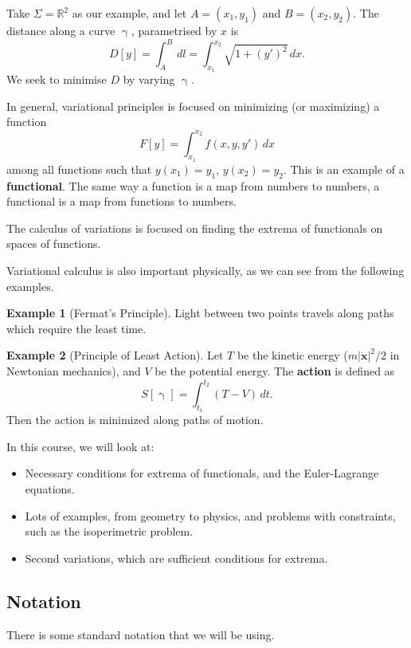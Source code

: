 \documentclass[12pt]{article}
\theoremstyle{definition}
\newtheorem{example}{Example}[section]
\theoremstyle{remark}
\begin{document}
Take $\Sigma = \mathbb{R}^2$ as our example, and let $A = (x_1, y_1)$ and $B = (x_2, y_2)$. The distance along a curve $\upgamma$, parametrised by $x$ is
\[
	D[y] = \int_{A}^{B} \, dl = \int_{x_1}^{x_2} \sqrt{1 + (y')^2} \, dx
.\]
We seek to minimise $D$ by varying $\upgamma$.

In general, variational principles is focused on minimizing (or maximizing) a function
\[
	F[y] = \int_{x_1}^{x_2}f(x, y, y') \, dx
\]
among all functions such that $y(x_1) = y_1$, $y(x_2) = y_2$. This is an example of a \textbf{functional}. The same way a function is a map from numbers to numbers, a functional is a map from functions to numbers.

The calculus of variations is focused on finding the extrema of functionals on spaces of functions.

Variational calculus is also important physically, as we can see from the following examples.

\begin{example}[Fermat's Principle]
	Light between two points travels along paths which require the least time.
\end{example}

\begin{example}[Principle of Least Action]
	Let $T$ be the kinetic energy ($m|\mathbf{ \dot x}|^2/2$ in Newtonian mechanics), and $V$ be the potential energy. The \textbf{action} is defined as
	\[
		S[\upgamma] = \int_{t_1}^{t_2} (T - V) \, dt
	.\]
	Then the action is minimized along paths of motion.
\end{example}

In this course, we will look at:
\begin{itemize}
	\item Necessary conditions for extrema of functionals, and the Euler-Lagrange equations.
	\item Lots of examples, from geometry to physics, and problems with constraints, such as the isoperimetric problem.
	\item Second variations, which are sufficient conditions for extrema.
\end{itemize}

\subsection{Notation}%
\label{sub:notation}

There is some standard notation that we will be using.
\end{document}
